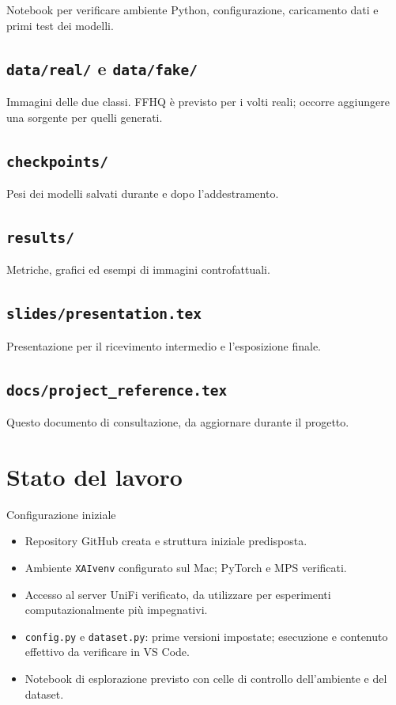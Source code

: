 \documentclass[10pt,a4paper,oneside]{book}
\begin{document}
Notebook per verificare ambiente Python, configurazione, caricamento dati
e primi test dei modelli.

\subsection{\texttt{data/real/} e \texttt{data/fake/}}

Immagini delle due classi. FFHQ è previsto per i volti reali; occorre
aggiungere una sorgente per quelli generati.

\subsection{\texttt{checkpoints/}}

Pesi dei modelli salvati durante e dopo l'addestramento.

\subsection{\texttt{results/}}

Metriche, grafici ed esempi di immagini controfattuali.

\subsection{\texttt{slides/presentation.tex}}

Presentazione per il ricevimento intermedio e l'esposizione finale.

\subsection{\texttt{docs/project\_reference.tex}}

Questo documento di consultazione, da aggiornare durante il progetto.


\section{Stato del lavoro}

\begin{examplebox}{Configurazione iniziale}
\begin{itemize}
    \item Repository GitHub creata e struttura iniziale predisposta.
    \item Ambiente \texttt{XAIvenv} configurato sul Mac; PyTorch e MPS verificati.
    \item Accesso al server UniFi verificato, da utilizzare per esperimenti
          computazionalmente più impegnativi.
    \item \texttt{config.py} e \texttt{dataset.py}: prime versioni impostate;
          esecuzione e contenuto effettivo da verificare in VS Code.
    \item Notebook di esplorazione previsto con celle di controllo
          dell'ambiente e del dataset.
\end{itemize}
\end{examplebox}
\end{document}
